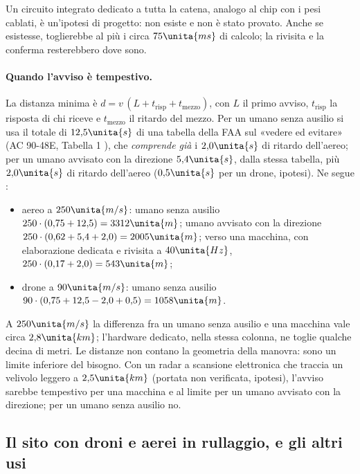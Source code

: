 Un circuito integrato dedicato a tutta la catena, analogo al chip con i pesi cablati, è un'ipotesi di progetto: non esiste e non è stato provato. Anche se esistesse, toglierebbe al più i circa $75\unita{ms}$ di calcolo; la rivisita e la conferma resterebbero dove sono.

\paragraph{Quando l'avviso è tempestivo.} La distanza minima è $d=v\,(L+t_{\mathrm{risp}}+t_{\mathrm{mezzo}})$, con $L$ il primo avviso, $t_{\mathrm{risp}}$ la risposta di chi riceve e $t_{\mathrm{mezzo}}$ il ritardo del mezzo. Per un umano senza ausilio si usa il totale di $12{,}5\unita{s}$ di una tabella della FAA sul «vedere ed evitare» (AC 90-48E, Tabella 1 \citep{faa-ac-90-48e}), che \emph{comprende già} i $2{,}0\unita{s}$ di ritardo dell'aereo; per un umano avvisato con la direzione $5{,}4\unita{s}$, dalla stessa tabella, più $2{,}0\unita{s}$ di ritardo dell'aereo ($0{,}5\unita{s}$ per un drone, ipotesi). Ne segue :
\begin{itemize}
\item aereo a $250\unita{m/s}$: umano senza ausilio $250\cdot(0{,}75+12{,}5)=3312\unita{m}$; umano avvisato con la direzione $250\cdot(0{,}62+5{,}4+2{,}0)=2005\unita{m}$; verso una macchina, con elaborazione dedicata e rivisita a $40\unita{Hz}$, $250\cdot(0{,}17+2{,}0)=543\unita{m}$;
\item drone a $90\unita{m/s}$: umano senza ausilio $90\cdot(0{,}75+12{,}5-2{,}0+0{,}5)=1058\unita{m}$.
\end{itemize}
A $250\unita{m/s}$ la differenza fra un umano senza ausilio e una macchina vale circa $2{,}8\unita{km}$; l'hardware dedicato, nella stessa colonna, ne toglie qualche decina di metri. Le distanze non contano la geometria della manovra: sono un limite inferiore del bisogno. Con un radar a scansione elettronica che traccia un velivolo leggero a $2{,}5\unita{km}$ (portata non verificata, ipotesi), l'avviso sarebbe tempestivo per una macchina e al limite per un umano avvisato con la direzione; per un umano senza ausilio no.

\subsection{Il sito con droni e aerei in rullaggio, e gli altri usi}\label{sec:vo-altri}


